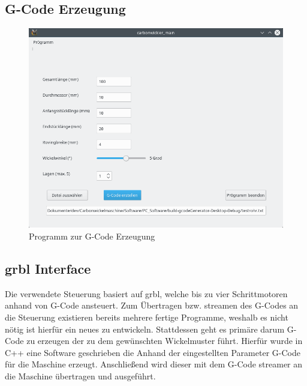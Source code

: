 \documentclass[paper=A4,pagesize,DIV=18, 12pt,listof=totoc,bibliography=totoc,headings=optiontohead,open=any]{article}
\begin{document}
\subsection{G-Code Erzeugung}
\begin{figure}[H]
	\centering
	\includegraphics[width=1\textwidth]{bilder/carbowickler_software.png}
	\caption{Programm zur G-Code Erzeugung} 
	\label{fig:g-code}
\end{figure}


\subsection{grbl Interface}
Die verwendete Steuerung basiert auf grbl\cite{grbl}, welche bis zu vier Schrittmotoren anhand von G-Code ansteuert. Zum Übertragen bzw. streamen des G-Codes an die Steuerung existieren bereits mehrere fertige Programme, weshalb es nicht nötig ist hierfür ein neues zu entwickeln. Stattdessen geht es primäre darum G-Code zu erzeugen der zu dem gewünschten Wickelmuster führt. Hierfür wurde in C++ eine Software geschrieben die Anhand der eingestellten Parameter G-Code für die Maschine erzeugt. Anschließend wird dieser mit dem G-Code streamer an die Maschine übertragen und ausgeführt.\\

\newpage
\printbibliography
\end{document}
